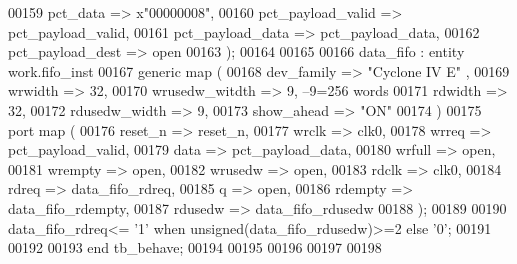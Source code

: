 \begin{DoxyCode}
00159         pct_data                    => x"00000008",
00160         pct_payload_valid       => pct_payload_valid,
00161         pct_payload_data        => pct_payload_data,
00162         pct_payload_dest        => \textcolor{keywordflow}{open}
00163         \textcolor{vhdlchar}{)};
00164 
00165 
00166 data\_fifo   : \textcolor{keywordflow}{entity} work.fifo_inst 
00167 \textcolor{keywordflow}{generic} \textcolor{keywordflow}{map} (
00168             dev_family          => \textcolor{keyword}{"Cyclone IV E"}  ,
00169             wrwidth             => \textcolor{vhdllogic}{32},
00170             wrusedw_witdth      => \textcolor{vhdllogic}{9},\textcolor{keyword}{ --9=256 words }
00171             rdwidth             => \textcolor{vhdllogic}{32},
00172             rdusedw_width       => \textcolor{vhdllogic}{9},
00173             show_ahead          => \textcolor{keyword}{"ON"}
00174 \textcolor{vhdlchar}{)}
00175 \textcolor{keywordflow}{port} \textcolor{keywordflow}{map} (
00176       reset_n       => reset_n, 
00177       wrclk         => clk0, 
00178       wrreq         => pct_payload_valid, 
00179       data          => pct_payload_data, 
00180       wrfull        => \textcolor{keywordflow}{open}, 
00181         wrempty       => \textcolor{keywordflow}{open}, 
00182       wrusedw       => \textcolor{keywordflow}{open}, 
00183       rdclk          => clk0, 
00184       rdreq         => data_fifo_rdreq, 
00185       q             => \textcolor{keywordflow}{open}, 
00186       rdempty       => data_fifo_rdempty, 
00187       rdusedw       => data_fifo_rdusedw   
00188 \textcolor{vhdlchar}{)};
00189 
00190 \textcolor{vhdlchar}{data_fifo_rdreq}\textcolor{vhdlchar}{<=} \textcolor{vhdlchar}{'}\textcolor{vhdllogic}{}\textcolor{vhdllogic}{1}\textcolor{vhdlchar}{'} \textcolor{keywordflow}{when} \textcolor{comment}{unsigned}\textcolor{vhdlchar}{(}\textcolor{vhdlchar}{data_fifo_rdusedw}\textcolor{vhdlchar}{)}\textcolor{vhdlchar}{>=}\textcolor{vhdllogic}{}\textcolor{vhdllogic}{2} \textcolor{keywordflow}{else} \textcolor{vhdlchar}{'}\textcolor{vhdllogic}{}\textcolor{vhdllogic}{0}\textcolor{vhdlchar}{'};
00191 
00192 
00193     \textcolor{keywordflow}{end} \textcolor{vhdlchar}{tb\_behave};
00194   
00195   
00196 
00197 
00198   
\end{DoxyCode}
